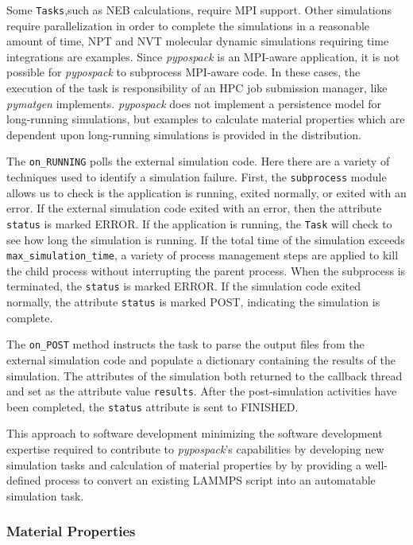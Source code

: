 Some \verb|Tasks|,such as NEB calculations, require MPI support.  Other simulations require parallelization in order to complete the simulations in a reasonable amount of time,  NPT and NVT molecular dynamic simulations requiring time integrations are examples.
Since \emph{pypospack} is an MPI-aware application, it is not possible for \emph{pypospack} to subprocess MPI-aware code.  In these cases, the execution of the task is responsibility of an HPC job submission manager, like \emph{pymatgen} implements.  \emph{pypospack} does not implement a persistence model for long-running simulations, but examples to calculate material properties which are dependent upon long-running simulations is provided in the distribution.

The \verb|on_RUNNING| polls the external simulation code.  Here there are a variety of techniques used to identify a simulation failure.  First, the \verb|subprocess| module allows us to check is the application is running, exited normally, or exited with an error.  If the external simulation code exited with an error, then the attribute \verb|status| is marked ERROR.    If the application is running, the \verb|Task| will check to see how long the simulation is running. If the total time of the simulation exceeds \verb|max_simulation_time|, a variety of process management steps are applied to kill the child process without interrupting the parent process.  When the subprocess is terminated, the \verb|status| is marked ERROR.  If the simulation code exited normally, the attribute \verb|status| is marked POST, indicating the simulation is complete.

The \verb|on_POST| method instructs the task to parse the output files from the external simulation code and populate a dictionary containing the results of the simulation.  The attributes of the simulation both returned to the callback thread and set as the attribute value \verb|results|.  After the post-simulation activities have been completed, the \verb|status| attribute is sent to FINISHED.

This approach to software development minimizing the software development expertise required to contribute to \emph{pypospack}'s capabilities by developing new simulation tasks and calculation of material properties by by providing a well-defined process to convert an existing LAMMPS script into an automatable simulation task.

\subsubsection{Material Properties}

